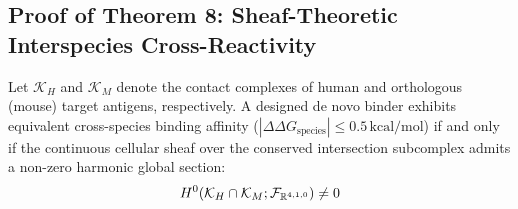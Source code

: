 \subsection{Proof of Theorem 8: Sheaf-Theoretic Interspecies Cross-Reactivity}
\begin{theorem}
\label{thm:sheaf_cross_reactivity}
Let $\mathcal{K}_H$ and $\mathcal{K}_M$ denote the contact complexes of human and orthologous (mouse) target antigens, respectively. A designed de novo binder exhibits equivalent cross-species binding affinity ($|\Delta\Delta G_{\text{species}}| \le 0.5\,\text{kcal/mol}$) if and only if the continuous cellular sheaf over the conserved intersection subcomplex admits a non-zero harmonic global section:
\begin{equation}
    H^0(\mathcal{K}_H \cap \mathcal{K}_M; \mathcal{F}_{\mathbb{R}^{4,1,0}}) \ne 0
\end{equation}
\end{theorem}

